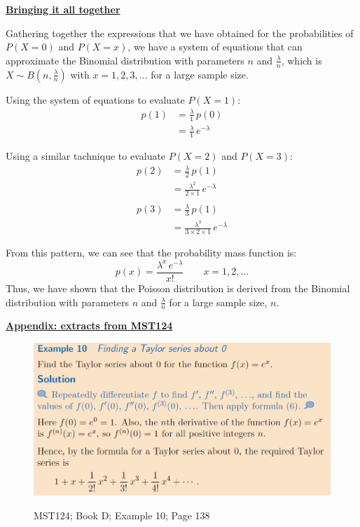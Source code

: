\documentclass[a4paper, 12pt]{article}
\newcounter{QEq}				%
\numberwithin{equation}{QEq}	%
\begin{document}
\vspace{10mm}

\textbf{\underline{Bringing it all together}}

Gathering together the expressions that we have obtained for the probabilities of \(P(X=0)\) and \(P(X=x)\), we have a system of equations that can approximate the Binomial distribution with parameters \(n\) and \(\frac{\lambda}{n}\), which is \(X \sim B(n, \frac{\lambda}{n})\) with \(x=1,2,3,\ldots\) for a large sample size.

Using the system of equations to evaluate \(P(X=1)\):
\begin{align*}
	p(1) &= \frac{\lambda}{1} \, p(0) \\[2mm]
	&= \frac{\lambda}{1} \, e^{-\lambda}
\end{align*}

Using a similar tachnique to evaluate \(P(X=2)\) and \(P(X=3)\):
\begin{align*}
	p(2) &= \frac{\lambda}{2} \, p(1) \\[2mm]
	&= \frac{\lambda^2}{2 \times 1} \, e^{-\lambda} \\[2mm]\\
	p(3) &= \frac{\lambda}{3} \, p(1) \\[2mm]
	&= \frac{\lambda^3}{3 \times 2 \times 1} \, e^{-\lambda}
\end{align*}

From this pattern, we can see that the probability mass function is:
\begin{equation}
p(x) = \frac{\lambda^x \, e^{-\lambda}}{x!} \qquad x=1,2, \dots \label{eq:bingo}
\end{equation}
Thus, we have shown that the Poisson distribution is derived from the Binomial distribution with parameters \(n\) and \(\frac{\lambda}{n}\) for a large sample size, \(n\).

\vspace{40mm}

\textbf{\underline{Appendix: extracts from MST124}}

\begin{figure}[h!]
\centering
	\includegraphics[scale=0.68]{TaylorSeries.png} \\
	\caption{MST124; Book D; Example 10; Page 138}
\end{figure}
\end{document}
